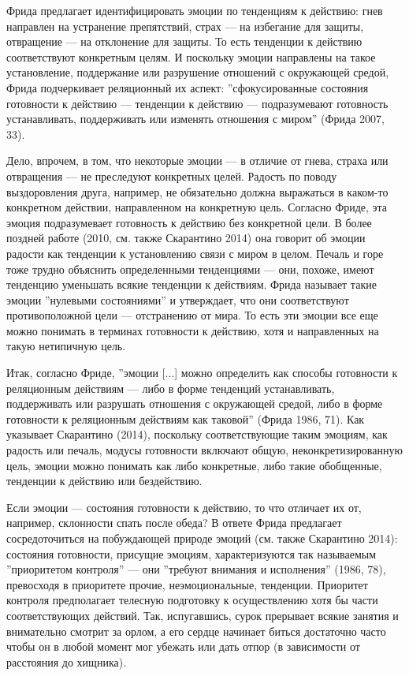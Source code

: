 \documentclass[11pt]{book}
\begin{document}
Фрида предлагает идентифицировать эмоции по тенденциям к действию: гнев направлен на устранение препятствий, страх --- на избегание для защиты, отвращение --- на отклонение для защиты. То есть тенденции к действию соответствуют конкретным целям. И поскольку эмоции направлены на такое установление, поддержание или разрушение отношений с окружающей средой, Фрида подчеркивает реляционный их аспект: ''сфокусированные состояния готовности к действию --- тенденции к действию --- подразумевают готовность устанавливать, поддерживать или изменять отношения с миром'' (Фрида 2007, 33).

Дело, впрочем, в том, что некоторые эмоции --- в отличие от гнева, страха или отвращения --- не преследуют конкретных целей. Радость по поводу выздоровления друга, например, не обязательно должна выражаться в каком-то конкретном действии, направленном на конкретную цель. Согласно Фриде, эта эмоция подразумевает готовность к действию без конкретной цели. В более поздней работе (2010, см. также Скарантино 2014) она говорит об эмоции радости как тенденции к установлению связи с миром в целом. Печаль и горе тоже трудно объяснить определенными тенденциями --- они, похоже, имеют тенденцию уменьшать всякие тенденции к действиям. Фрида называет такие эмоции ''нулевыми состояниями'' и утверждает, что они соответствуют противоположной цели --- отстранению от мира. То есть эти эмоции все еще можно понимать в терминах готовности к действию, хотя и направленных на такую нетипичную цель.

Итак, согласно Фриде, ''эмоции [...] можно определить как способы готовности к реляционным действиям --- либо в форме тенденций устанавливать, поддерживать или разрушать отношения с окружающей средой, либо в форме готовности к реляционным действиям как таковой'' (Фрида 1986, 71). Как указывает Скарантино (2014), поскольку соответствующие таким эмоциям, как радость или печаль, модусы готовности включают общую, неконкретизированную цель, эмоции можно понимать как либо конкретные, либо такие обобщенные, тенденции к действию или бездействию.

Если эмоции --- состояния готовности к действию, то что отличает их от, например, склонности спать после обеда? В ответе Фрида предлагает сосредоточиться на побуждающей природе эмоций (см. также Скарантино 2014): состояния готовности, присущие эмоциям, характеризуются так называемым ''приоритетом контроля'' --- они ''требуют внимания и исполнения'' (1986, 78), превосходя в приоритете прочие, неэмоциональные, тенденции. Приоритет контроля предполагает телесную подготовку к осуществлению хотя бы части соответствующих действий. Так, испугавшись, сурок прерывает всякие занятия и внимательно смотрит за орлом, а его сердце начинает биться достаточно часто чтобы он в любой момент мог убежать или дать отпор (в зависимости от расстояния до хищника).
\end{document}
